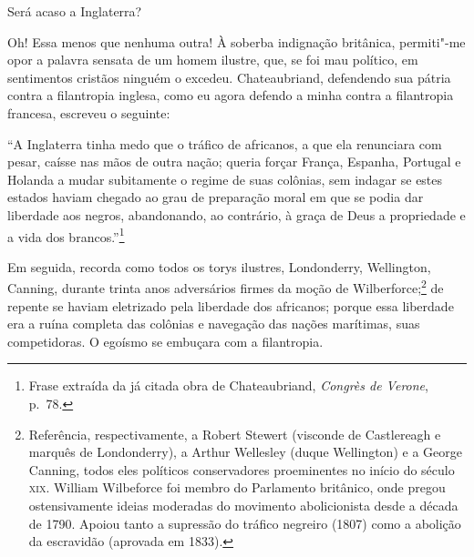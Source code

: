 Será acaso a Inglaterra?

Oh! Essa menos que nenhuma outra! À soberba indignação britânica,
permiti"-me opor a palavra sensata de um homem ilustre, que, se foi
mau político, em sentimentos cristãos ninguém o excedeu. Chateaubriand,
defendendo sua pátria contra a filantropia inglesa, como eu agora
defendo a minha contra a filantropia francesa, escreveu o seguinte: 

 ``A Inglaterra tinha medo que o tráfico de africanos, a que ela
renunciara com pesar, caísse nas mãos de outra nação; queria forçar
França, Espanha, Portugal e Holanda a mudar subitamente o regime de
suas colônias, sem indagar se estes estados haviam chegado ao grau de
preparação moral em que se podia dar liberdade aos negros, abandonando,
ao contrário, à graça de Deus a propriedade e a vida dos
brancos.''\footnote{ Frase extraída da já citada obra de Chateaubriand, 
\textit{Congrès de Verone}, p.~78.}
 

 Em seguida, recorda como todos os torys ilustres, Londonderry,
Wellington, Canning, durante trinta anos adversários firmes da moção de
Wilberforce;\footnote{ Referência, respectivamente, a Robert Stewert (visconde de Castlereagh
e marquês de Londonderry), a Arthur Wellesley (duque Wellington) e a
George Canning, todos eles políticos conservadores proeminentes no
início do século \textsc{xix}. William Wilbeforce foi membro do Parlamento
britânico, onde pregou ostensivamente ideias moderadas do movimento
abolicionista desde a década de 1790. Apoiou tanto a supressão do
tráfico negreiro (1807) como a abolição da escravidão (aprovada em 1833).} 
de repente se haviam eletrizado pela liberdade dos africanos; porque
essa liberdade era a ruína completa das colônias e navegação das nações
marítimas, suas competidoras. O egoísmo se embuçara com a filantropia.

